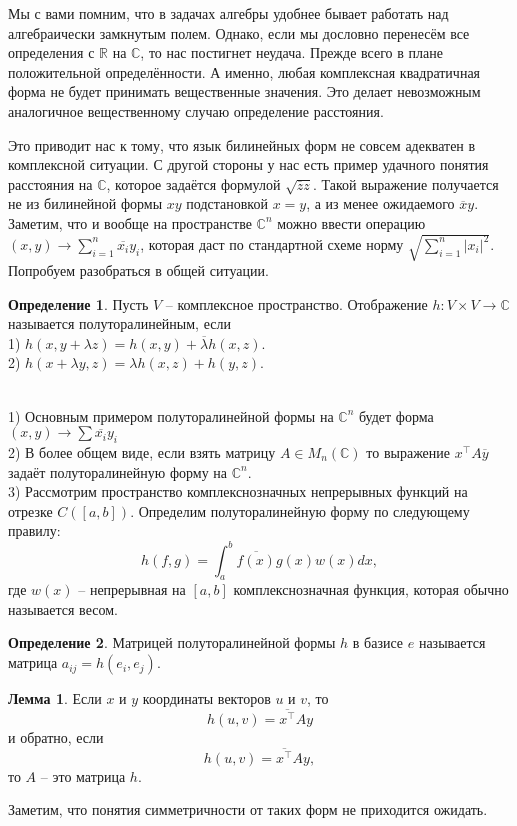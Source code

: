 \documentclass[10pt,a4paper,oneside]{book} %
\theoremstyle{definition}
\newtheorem*{defn}{Определение}
\newtheorem{lem}{Лемма}
\newcommand{\mb}[1]{\mathbb{#1}}
\newcommand{\ovl}{\overline}
\def\exm{\noindent {\bf Примеры:}}
\def\dfn{\begin{defn}}
\def\edfn{\end{defn}}
\def\lm{\begin{lem}}
\def\elm{\end{lem}}
\begin{document}
Мы с вами помним, что в задачах алгебры  удобнее бывает работать над алгебраически замкнутым полем. Однако, если мы дословно перенесём все определения с $\mb R$ на $\mb C$, то нас постигнет неудача. Прежде всего в плане положительной определённости. А именно, любая комплексная квадратичная форма не будет принимать вещественные значения. Это делает невозможным аналогичное вещественному случаю определение расстояния. 

Это приводит нас к тому, что язык билинейных форм не совсем адекватен в комплексной ситуации. С другой стороны у нас есть пример удачного понятия расстояния на $\mb C$, которое задаётся формулой $\sqrt{\ovl{z}z}$. Такой выражение получается не из билинейной формы $xy$ подстановкой $x=y$, а из менее ожидаемого $\ovl{x}y$. Заметим, что и вообще на пространстве $\mb C^n$ можно ввести операцию $
(x,y) \to \sum_{i=1}^n \ovl{x_i}y_i$, которая даст по стандартной схеме норму $\sqrt{\sum_{i=1}^n |x_i|^2}$. Попробуем разобраться в общей ситуации.

\dfn Пусть $V$ -- комплексное пространство.  Отображение $h\colon V \times V \to \mb C$ называется полуторалинейным, если \\
1) $h(x,y+\lambda z)=h(x,y)+\ovl{\lambda} h(x,z)$. \\
2) $h(x+\lambda y,z)=\lambda h(x,z)+h(y,z)$.
\edfn

\exm\\
1) Основным примером полуторалинейной формы на $\mb C^n$ будет форма $(x,y)\to \sum \ovl{x_i}y_i$\\
2) В более общем виде, если взять матрицу $A\in M_n(\mb C)$  то выражение $x^{\top}A\ovl{y}$ задаёт полуторалинейную форму на $\mb C^n$.\\
3) Рассмотрим пространство комплекснозначных непрерывных функций на отрезке $C([a,b])$. Определим полуторалинейную форму по следующему правилу:
$$h(f,g)=\int_a^b \ovl{f(x)}g(x)w(x)dx,$$
где $w(x)$ -- непрерывная на $[a,b]$ комплекснозначная функция, которая обычно называется весом.\\



\dfn Матрицей полуторалинейной формы $h$
в базисе $e$ называется матрица $a_{ij}=h(e_i,e_j)$. 
\edfn

\lm Если $x$ и $y$ координаты векторов $u$ и $v$, то $$h(u,v)=\ovl{x^{\top}}Ay$$
и обратно, если $$h(u,v)=\ovl{x^{\top}}Ay,$$
то $A$ -- это матрица $h$.
\elm



Заметим, что понятия симметричности  от таких форм не приходится ожидать.
\end{document}
